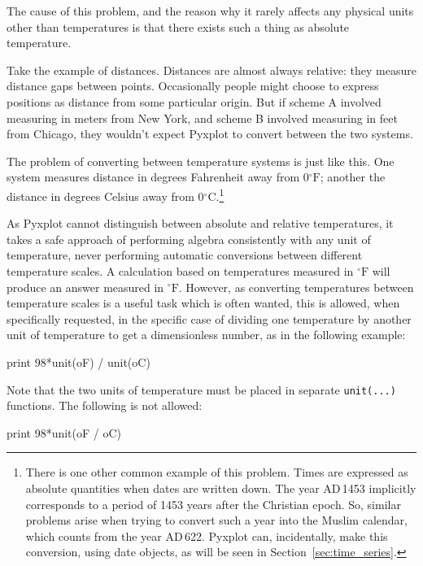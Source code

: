 The cause of this problem, and the reason why it rarely affects any physical
units other than temperatures is that there exists such a thing as absolute
temperature.

Take the example of distances. Distances are almost always relative: they
measure distance gaps between points. Occasionally people might choose to
express positions as distance from some particular origin. But if scheme A
involved measuring in meters from New York, and scheme B involved measuring in
feet from Chicago, they wouldn't expect Pyxplot to convert between the two
systems.

The problem of converting between temperature systems is just like this. One
system measures distance in degrees Fahrenheit away from 0$^\circ\mathrm{F}$;
another the distance in degrees Celsius away from
0$^\circ\mathrm{C}$.\footnote{There is one other common example of this
problem. Times are expressed as absolute quantities when dates are written
down. The year {\footnotesize AD}\,1453 implicitly corresponds to a period of
1453 years after the Christian epoch. So, similar problems arise when trying to
convert such a year into the Muslim calendar, which counts from the year
{\footnotesize AD}\,622. Pyxplot can, incidentally, make this conversion, using
date objects, as will be seen in Section~\ref{sec:time_series}.}

As Pyxplot cannot distinguish between absolute and relative temperatures, it
takes a safe approach of performing algebra consistently with any unit of
temperature, never performing automatic conversions between different
temperature scales. A calculation based on temperatures measured in
$^\circ\mathrm{F}$ will produce an answer measured in $^\circ\mathrm{F}$.
However, as converting temperatures between temperature scales is a useful task
which is often wanted, this is allowed, when specifically requested, in the
specific case of dividing one temperature by another unit of temperature to get
a dimensionless number, as in the following example:

\begin{dodo}
print 98*unit(oF) / unit(oC)
\end{dodo}

\noindent Note that the two units of temperature must be placed in separate
{\tt unit(...)} functions. The following is not allowed:

\begin{dontdo}
print 98*unit(oF / oC)
\end{dontdo}

